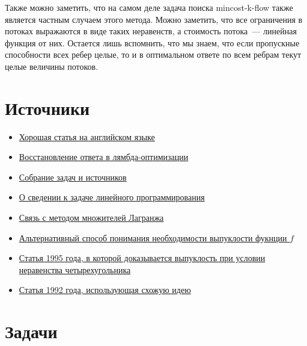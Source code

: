 Также можно заметить, что на самом деле задача поиска mincost-k-flow также является частным случаем этого метода. Можно заметить, что все ограничения в потоках выражаются в виде таких неравенств, а стоимость потока~--- линейная функция от них. Остается лишь вспомнить, что мы знаем, что если пропускные способности всех ребер целые, то и в оптимальном ответе по всем ребрам текут целые величины потоков.



\section{Источники}

\begin{itemize}
    \item \href{https://mamnoonsiam.github.io/posts/attack-on-aliens.html}{Хорошая статья на английском языке}
    \item \href{https://codeforces.com/blog/entry/92842}{Восстановление ответа в лямбда-оптимизации}
    \item \href{https://usaco.guide/adv/lagrange}{Собрание задач и источников}
    \item \href{https://codeforces.com/blog/entry/68778?#comment-700891}{О сведении к задаче линейного программирования}
    \item \href{https://codeforces.com/blog/entry/68778?#comment-531862}{Связь с методом множителей Лагранжа}
    \item \href{https://codeforces.com/blog/entry/69625?#comment-541307}{Альтернативный способ понимания необходимости выпуклости фукнции $f$}
    \item \href{https://cse.hkust.edu.hk/mjg_lib/bibs/DPSu/DPSu.Files/sdarticle_204.pdf}{Статья 1995 года, в которой доказывается выпуклость при условии неравенства четырехугольника}
    \item \href{https://web.archive.org/web/20210511084902/https://www.osti.gov/servlets/purl/10146169}{Статья 1992 года, использующая схожую идею}
\end{itemize}

\section{Задачи}

